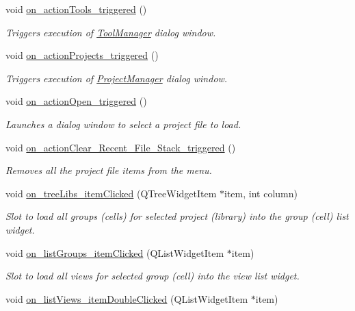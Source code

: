 \begin{DoxyCompactItemize}
void \hyperlink{classMainWindow_afd40b73a712b16f9c77dd029024b75ce}{on\-\_\-action\-Tools\-\_\-triggered} ()
\begin{DoxyCompactList}\small\item\em Triggers execution of \hyperlink{classToolManager}{Tool\-Manager} dialog window. \end{DoxyCompactList}\item 
void \hyperlink{classMainWindow_aa1d84c313076357330d8f2f9c0b0b96d}{on\-\_\-action\-Projects\-\_\-triggered} ()
\begin{DoxyCompactList}\small\item\em Triggers execution of \hyperlink{classProjectManager}{Project\-Manager} dialog window. \end{DoxyCompactList}\item 
void \hyperlink{classMainWindow_a48ed0a16f674e38e0e2a24274852a9af}{on\-\_\-action\-Open\-\_\-triggered} ()
\begin{DoxyCompactList}\small\item\em Launches a dialog window to select a project file to load. \end{DoxyCompactList}\item 
void \hyperlink{classMainWindow_a00f1c23c161a4384060fc8ee682e76ba}{on\-\_\-action\-Clear\-\_\-\-Recent\-\_\-\-File\-\_\-\-Stack\-\_\-triggered} ()
\begin{DoxyCompactList}\small\item\em Removes all the project file items from the menu. \end{DoxyCompactList}\item 
void \hyperlink{classMainWindow_a6559de64b12cdf8254275d87a4babc0a}{on\-\_\-tree\-Libs\-\_\-item\-Clicked} (Q\-Tree\-Widget\-Item $\ast$item, int column)
\begin{DoxyCompactList}\small\item\em Slot to load all groups (cells) for selected project (library) into the group (cell) list widget. \end{DoxyCompactList}\item 
void \hyperlink{classMainWindow_ad95e75085713bdbfa441172f267e7ea2}{on\-\_\-list\-Groups\-\_\-item\-Clicked} (Q\-List\-Widget\-Item $\ast$item)
\begin{DoxyCompactList}\small\item\em Slot to load all views for selected group (cell) into the view list widget. \end{DoxyCompactList}\item 
void \hyperlink{classMainWindow_a56d68978d07e45cffe0d6d925b647744}{on\-\_\-list\-Views\-\_\-item\-Double\-Clicked} (Q\-List\-Widget\-Item $\ast$item)

\end{DoxyCompactItemize}
